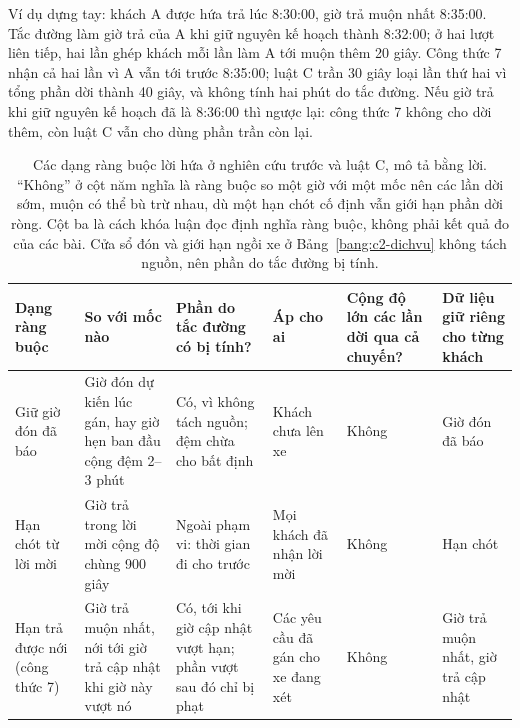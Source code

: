 Ví dụ dựng tay: khách A được hứa trả lúc 8:30:00, giờ trả muộn nhất 8:35:00. Tắc đường làm giờ trả của A khi giữ
nguyên kế hoạch thành 8:32:00; ở hai lượt liên tiếp, hai lần ghép khách mỗi lần làm A tới muộn thêm 20 giây. Công thức
7 nhận cả hai lần vì A vẫn tới trước 8:35:00; luật C trần 30 giây loại lần thứ hai vì tổng phần dời thành 40 giây,
và không tính hai phút do tắc đường. Nếu giờ trả khi giữ nguyên kế hoạch đã là 8:36:00 thì ngược lại: công thức 7
không cho dời thêm, còn luật C vẫn cho dùng phần trần còn lại.

\begin{table}[htbp]
\centering
\caption{Các dạng ràng buộc lời hứa ở nghiên cứu trước và luật C, mô tả bằng lời. ``Không'' ở cột năm nghĩa là ràng
buộc so một giờ với một mốc nên các lần dời sớm, muộn có thể bù trừ nhau, dù một hạn chót cố định vẫn giới hạn phần
dời ròng. Cột ba là cách khóa luận đọc định nghĩa ràng buộc, không phải kết quả đo của các bài. Cửa sổ đón và giới
hạn ngồi xe ở Bảng~\ref{bang:c2-dichvu} không tách nguồn, nên phần do tắc đường bị tính.}
\label{bang:c2-dangrangbuoc}
\footnotesize
\setlength{\tabcolsep}{3pt}
\begin{tabular}{@{}p{2.6cm}p{2.7cm}p{2.9cm}p{2.3cm}p{1.8cm}p{2.6cm}@{}}
\toprule
\textbf{Dạng ràng buộc} & \textbf{So với mốc nào} & \textbf{Phần do tắc đường có bị tính?} & \textbf{Áp cho ai} &
\textbf{Cộng độ lớn các lần dời qua cả chuyến?} & \textbf{Dữ liệu giữ riêng cho từng khách}\\
\midrule
Giữ giờ đón đã báo~\cite{alonsomora2017,fielbaum2020,lu2024} & Giờ đón dự kiến lúc gán, hay giờ hẹn ban đầu cộng đệm
2--3 phút & Có, vì không tách nguồn; đệm chừa cho bất định & Khách chưa lên xe & Không & Giờ đón đã báo\\
Hạn chót từ lời mời~\cite{schulz2026} & Giờ trả trong lời mời cộng độ chùng 900 giây & Ngoài phạm vi: thời gian đi
cho trước & Mọi khách đã nhận lời mời & Không & Hạn chót\\
Hạn trả được nới (công thức 7)~\cite{horl2022} & Giờ trả muộn nhất, nới tới giờ trả cập nhật khi giờ này vượt nó &
Có, tới khi giờ cập nhật vượt hạn; phần vượt sau đó chỉ bị phạt & Các yêu cầu đã gán cho xe đang xét & Không & Giờ
trả muộn nhất, giờ trả cập nhật\\

\end{tabular}
\end{table}
